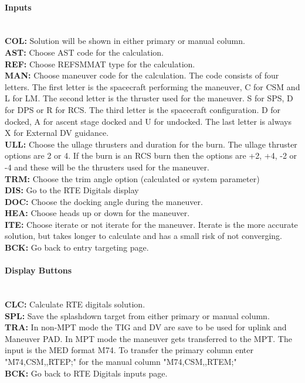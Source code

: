 \documentclass[11pt]{article} %
\begin{document}
\paragraph{Inputs}\mbox{} \\
\textbf{COL:} Solution will be shown in either primary or manual column.\\
\textbf{AST:} Choose AST code for the calculation.\\
\textbf{REF:} Choose REFSMMAT type for the calculation.\\
\textbf{MAN:} Choose maneuver code for the calculation. The code consists of four letters. The first letter is the spacecraft performing the maneuver, C for CSM and L for LM. The second letter is the thruster used for the maneuver. S for SPS, D for DPS or R for RCS. The third letter is the spacecraft configuration. D for docked, A for ascent stage docked and U for undocked. The last letter is always X for External DV guidance.\\
\textbf{ULL:} Choose the ullage thrusters and duration for the burn. The ullage thruster options are 2 or 4. If the burn is an RCS burn then the options are +2, +4, -2 or -4 and these will be the thrusters used for the maneuver.\\
\textbf{TRM:} Choose the trim angle option (calculated or system parameter)\\

\textbf{DIS:} Go to the RTE Digitals display\\
\textbf{DOC:} Choose the docking angle during the maneuver.\\
\textbf{HEA:} Choose heads up or down for the maneuver.\\
\textbf{ITE:} Choose iterate or not iterate for the maneuver. Iterate is the more accurate solution, but takes longer to calculate and has a small risk of not converging.\\
\textbf{BCK:} Go back to entry targeting page.\\
\paragraph{Display Buttons}\mbox{} \\

\textbf{CLC:} Calculate RTE digitals solution.\\
\textbf{SPL:} Save the splashdown target from either primary or manual column.\\
\textbf{TRA:} In non-MPT mode the TIG and DV are save to be used for uplink and Maneuver PAD. In MPT mode the maneuver gets transferred to the MPT. The input is the MED format M74. To transfer the primary column enter "M74,CSM,,RTEP;" for the manual column "M74,CSM,,RTEM;"\\
\textbf{BCK:} Go back to RTE Digitals inputs page.\\
\newpage
\end{document}
